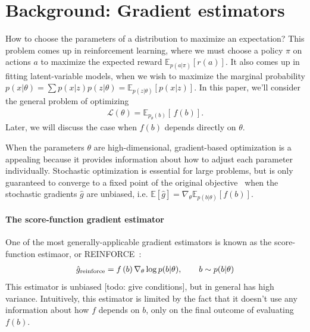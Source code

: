 \documentclass{article}
\newcommand{\discreteDist}{p_{\theta}(b)}
\newcommand{\loss}{f(b)}
\newcommand{\expectedLoss}{\mathbb{E}_{\discreteDist{}} \! \left[ \, \loss{} \right]}
\begin{document}
\section{Background: Gradient estimators}
How to choose the parameters of a distribution to maximize an expectation?
This problem comes up in reinforcement learning, where we must choose a policy $\pi$ on actions $a$ to maximize the expected reward $\mathbb{E}_{p(a|\pi)} \left[ r(a) \right]$.
It also comes up in fitting latent-variable models, when we wish to maximize the marginal probability ${p(x|\theta) = \sum p(x|z) p(z|\theta) = \mathbb{E}_{p(z|\theta)} \left[ p(x|z) \right]}$.
In this paper, we'll consider the general problem of optimizing
%
\begin{align}
\mathcal{L}(\theta)=\expectedLoss{}.
\end{align}
%
Later, we will discuss the case when $\loss{}$ depends directly on $\theta$.

When the parameters $\theta$ are high-dimensional, gradient-based optimization is a appealing because it provides information about how to adjust each parameter individually.
Stochastic optimization is essential for large problems, but is only guaranteed to converge to a fixed point of the original objective~\citep{robbins1951stochastic} when the stochastic gradients $\hat g$ are unbiased, i.e. ${\mathbb{E} \left[ \hat g \right] = \nabla_\theta \mathbb{E}_{p(b|\theta)} \left[ f(b) \right]}$.

\paragraph{The score-function gradient estimator}
One of the most generally-applicable gradient estimators is known as the score-function estimaor, or REINFORCE~\citep{williams1992simple}:
%
\begin{align}
\hat g_\textnormal{reinforce} =  f \left( b \right) \nabla_\theta \log p(b | \theta), \qquad b \sim p(b | \theta)
\end{align}
%
This estimator is unbiased [todo: give conditions], but in general has high variance.
Intuitively, this estimator is limited by the fact that it doesn't use any information about how $f$ depends on $b$, only on the final outcome of evaluating $f(b)$.
\end{document}
